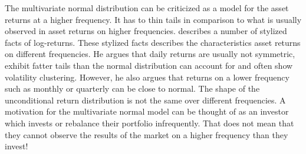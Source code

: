 \documentclass[oneside]{book}\usepackage{knitr}
\begin{document}
The multivariate normal distribution can be criticized as a model for the asset returns at a higher frequency. 
It has to thin tails in comparison to what is usually observed in asset returns on higher frequencies.
\citet{cont2001empirical} describes a number of stylized facts of log-returns. 
These stylized facts describes the characteristics asset returns on different frequencies.  
He argues that daily returns are usually not symmetric, exhibit fatter tails than the normal distribution can account for and often show volatility clustering.  
However, he also argues that returns on a lower frequency such as monthly or quarterly can be close to normal.
The shape of the unconditional return distribution is not the same over different frequencies. 
A motivation for the multivariate normal model can be thought of as an investor which invests or rebalance their portfolio infrequently.
That does not mean that they cannot observe the results of the market on a higher frequency than they invest!
\end{document}
